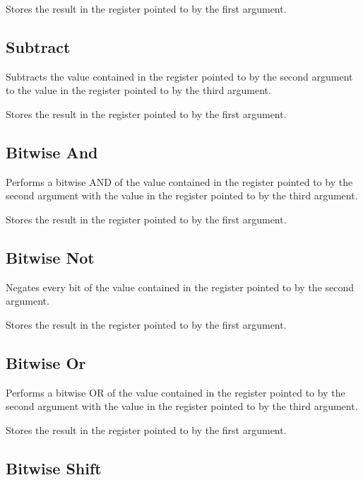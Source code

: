 Stores the result in the register pointed to by the first argument.

\subsection{Subtract}


Subtracts the value contained in the register pointed to by the second argument to the value in the register pointed to by the third argument.

Stores the result in the register pointed to by the first argument.

\subsection{Bitwise And}


Performs a bitwise AND of the value contained in the register pointed to by the second argument with the value in the register pointed to by the third argument.

Stores the result in the register pointed to by the first argument.

\subsection{Bitwise Not}


Negates every bit of the value contained in the register pointed to by the second argument.

Stores the result in the register pointed to by the first argument.

\subsection{Bitwise Or}


Performs a bitwise OR of the value contained in the register pointed to by the second argument with the value in the register pointed to by the third argument.

Stores the result in the register pointed to by the first argument.

\subsection{Bitwise Shift}


